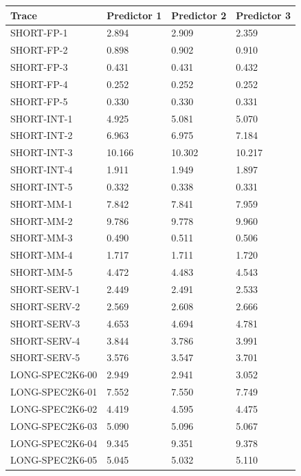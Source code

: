 \documentclass{article}
\begin{document}
\begin{table}[h]
    \centering
    \begin{tabular}{llll}
        \toprule
        \textbf{Trace} & \textbf{Predictor 1} & \textbf{Predictor 2} & \textbf{Predictor 3} \\
        \midrule
        SHORT-FP-1  & 2.894 & 2.909 & 2.359 \\
        SHORT-FP-2  & 0.898 & 0.902 & 0.910 \\
        SHORT-FP-3  & 0.431 & 0.431 & 0.432 \\
        SHORT-FP-4  & 0.252 & 0.252 & 0.252 \\
        SHORT-FP-5  & 0.330 & 0.330 & 0.331 \\
        SHORT-INT-1  & 4.925 & 5.081 & 5.070 \\
        SHORT-INT-2  & 6.963 & 6.975 & 7.184 \\
        SHORT-INT-3  & 10.166 & 10.302 & 10.217 \\
        SHORT-INT-4  & 1.911 & 1.949 & 1.897 \\
        SHORT-INT-5  & 0.332 & 0.338 & 0.331 \\
        SHORT-MM-1  & 7.842 & 7.841 & 7.959 \\
        SHORT-MM-2  & 9.786 & 9.778 & 9.960 \\
        SHORT-MM-3  & 0.490 & 0.511 & 0.506 \\
        SHORT-MM-4  & 1.717 & 1.711 & 1.720 \\
        SHORT-MM-5  & 4.472 & 4.483 & 4.543 \\
        SHORT-SERV-1  & 2.449 & 2.491 & 2.533 \\
        SHORT-SERV-2  & 2.569 & 2.608 & 2.666 \\
        SHORT-SERV-3  & 4.653 & 4.694 & 4.781 \\
        SHORT-SERV-4  & 3.844 & 3.786 & 3.991 \\
        SHORT-SERV-5  & 3.576 & 3.547 & 3.701 \\
        LONG-SPEC2K6-00  & 2.949 & 2.941 & 3.052 \\
        LONG-SPEC2K6-01  & 7.552 & 7.550 & 7.749 \\
        LONG-SPEC2K6-02  & 4.419 & 4.595 & 4.475 \\
        LONG-SPEC2K6-03  & 5.090 & 5.096 & 5.067 \\
        LONG-SPEC2K6-04  & 9.345 & 9.351 & 9.378 \\
        LONG-SPEC2K6-05  & 5.045 & 5.032 & 5.110 \\

\end{tabular}
\end{table}
\end{document}
